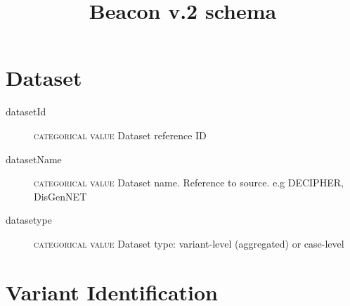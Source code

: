 \documentclass[a4paper, 10pt]{article}        %
\begin{document}
\title{Beacon v.2 schema}
\date{} %
\maketitle





 \section*{{\color{teal}Dataset}}
 \begin{description}
  	\item[datasetId] {\textsc{categorical value}} Dataset reference ID
	\item[datasetName] {\textsc{categorical value}} Dataset name. Reference to source. e.g DECIPHER, DisGenNET
	\item[datasetype] {\textsc{categorical value}} Dataset type: variant-level (aggregated) or case-level 
  \end{description}

\section*{{\color{teal}Variant Identification}}

\end{document}
